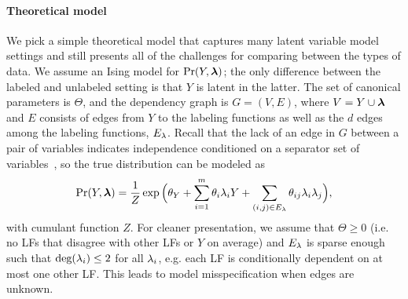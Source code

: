 \paragraph{Theoretical model}
We pick a simple theoretical model that captures many latent variable model settings and still presents all of the challenges for comparing between the types of data. We assume an Ising model for $\Pr(Y, \bm{\lambda})$; the only difference between the labeled and unlabeled setting is that $Y$ is latent in the latter. %
The set of canonical parameters is $\Theta$, and the dependency graph is $G = (V, E)$, where $V = Y \cup \bm{\lambda}$ and $E$ consists of edges from $Y$ to the labeling functions as well as the $d$ edges among the labeling functions, $E_{\lambda}$. %
Recall that the lack of an edge in $G$ between a pair of
variables indicates independence conditioned on a separator set of
variables~\citep{Lauritzen}, so the true distribution can be modeled as
\begin{align}
    \Pr(Y, \bm{\lambda}) = \frac{1}{Z} \exp \Big(\theta_Y + \sum_{i = 1}^m \theta_i \lambda_i Y + \sum_{(i, j) \in E_{\lambda}} \theta_{ij} \lambda_i \lambda_j \Big),
    \label{eq:true_pgm} \nonumber 
\end{align}
with cumulant function $Z$. For cleaner presentation, we assume that $\Theta \ge 0$ (i.e. no LFs that disagree with other LFs or $Y$ on average) and $E_{\lambda}$ is sparse enough such that $\text{deg}(\lambda_i) \le 2$ for all $\lambda_i$, e.g. each LF is conditionally dependent on at most one other LF. This leads to model misspecification when edges are unknown.


